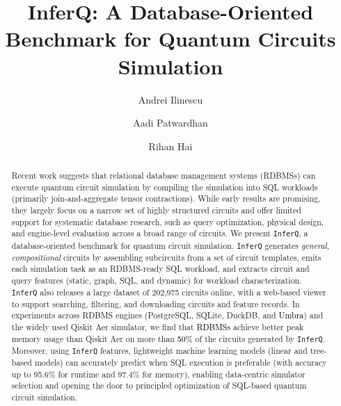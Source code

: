 \documentclass[acmsmall]{acmart}
\theoremstyle{definition}
\theoremstyle{definition}
\newcommand{\revisionB}[1]{\textcolor{black}{#1}}
\newcommand{\sys}{\texttt{InferQ}\xspace}
\begin{document}
\setlength{\pdfpagewidth}{6.75in}
\setlength{\pdfpageheight}{10in}


\title{InferQ: A Database-Oriented Benchmark for Quantum Circuits Simulation}

\author{Andrei Ilinescu}

\author{Aadi Patwardhan}
\authornotemark[1]

\author{Rihan Hai}



\begin{abstract}
Recent work suggests that relational database management systems (RDBMSs) can execute quantum circuit simulation by compiling the simulation into SQL workloads (primarily join-and-aggregate tensor contractions). While early results are promising, they largely focus on a narrow set of highly structured circuits and offer limited support for systematic database research, such as query optimization, physical design, and engine-level evaluation across a broad range of circuits.
We present \sys, a database-oriented benchmark for quantum circuit simulation. \sys generates \emph{general, compositional} circuits by assembling subcircuits from a set of circuit templates, emits each simulation task as an RDBMS-ready SQL workload, and extracts circuit and query features (static, graph, SQL, and dynamic) for workload characterization.
\sys also releases a large dataset of  202,975 circuits online, with a web-based viewer to support searching, filtering, and downloading circuits and feature records.
In experiments across RDBMS engines (PostgreSQL, SQLite, DuckDB, and \revisionB{Umbra}) and the widely used Qiskit Aer simulator, we find that  \revisionB{RDBMSs} achieve better peak memory usage than Qiskit Aer on more than \revisionB{50\%} of the circuits generated by \sys.
Moreover, using \sys features, lightweight machine learning models (linear and tree-based models) can accurately predict when SQL execution is preferable (with accuracy up to 95.6\% for runtime and 97.4\% for memory), enabling data-centric simulator selection and opening the door to principled optimization of SQL-based quantum circuit simulation.
\end{abstract}
\end{document}
